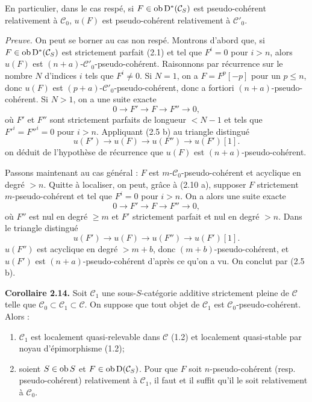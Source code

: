 \documentclass[11pt]{article}
\begin{document}
En particulier, dans le cas respé, si \(F\in\operatorname{ob}\mathrm D^*(\mathcal C_S)\) est pseudo-cohérent relativement à \(\mathcal C_0\), \(u(F)\) est pseudo-cohérent relativement à \(\mathcal C'_0\).

\emph{Preuve.} On peut se borner au cas non respé. Montrons d'abord que, si \(F\in\operatorname{ob}\mathrm D^*(\mathcal C_S)\) est strictement parfait (2.1) et tel que \(F^i=0\) pour \(i>n\), alors \(u(F)\) est \((n+a)\)-\(\mathcal C'_0\)-pseudo-cohérent. Raisonnons par récurrence sur le nombre \(N\) d'indices \(i\) tels que \(F^i\neq0\). Si \(N=1\), on a \(F=F^p[-p]\) pour un \(p\leq n\), donc \(u(F)\) est \((p+a)\)-\(\mathcal C'_0\)-pseudo-cohérent, donc a fortiori \((n+a)\)-pseudo-cohérent. Si \(N>1\), on a une suite exacte
\[
  0\longrightarrow F'\longrightarrow F\longrightarrow F''\longrightarrow 0,
\]
où \(F'\) et \(F''\) sont strictement parfaits de longueur \(<N-1\) et tels que \(F'^i=F''^i=0\) pour \(i>n\). Appliquant (2.5 b) au triangle distingué
\[
  u(F')\longrightarrow u(F)\longrightarrow u(F'')\longrightarrow u(F')[1].
\]
on déduit de l'hypothèse de récurrence que \(u(F)\) est \((n+a)\)-pseudo-cohérent.

Passons maintenant au cas général : \(F\) est \(m\)-\(\mathcal C_0\)-pseudo-cohérent et acyclique en degré \(>n\). Quitte à localiser, on peut, grâce à (2.10 a), supposer \(F\) strictement \(m\)-pseudo-cohérent et tel que \(F^i=0\) pour \(i>n\). On a alors une suite exacte
\[
  0\longrightarrow F'\longrightarrow F\longrightarrow F''\longrightarrow 0,
\]
où \(F''\) est nul en degré \(\geq m\) et \(F'\) strictement parfait et nul en degré \(>n\). Dans le triangle distingué
\[
  u(F')\longrightarrow u(F)\longrightarrow u(F'')\longrightarrow u(F')[1].
\]
\(u(F'')\) est acyclique en degré \(>m+b\), donc \((m+b)\)-pseudo-cohérent, et \(u(F')\) est \((n+a)\)-pseudo-cohérent d'après ce qu'on a vu. On conclut par (2.5 b).

\textbf{Corollaire 2.14.} Soit \(\mathcal C_1\) une sous-\(S\)-catégorie additive strictement pleine de \(\mathcal C\) telle que \(\mathcal C_0\subset\mathcal C_1\subset\mathcal C\). On suppose que tout objet de \(\mathcal C_1\) est \(\mathcal C_0\)-pseudo-cohérent. Alors :
\begin{enumerate}[label=(\roman*)]
\item \(\mathcal C_1\) est localement quasi-relevable dans \(\mathcal C\) (1.2) et localement quasi-stable par noyau d'épimorphisme (1.2);
\item soient \(S\in\operatorname{ob} S\) et \(F\in\operatorname{ob}\mathrm D(\mathcal C_S)\). Pour que \(F\) soit \(n\)-pseudo-cohérent (resp. pseudo-cohérent) relativement à \(\mathcal C_1\), il faut et il suffit qu'il le soit relativement à \(\mathcal C_0\).
\end{enumerate}
\end{document}
